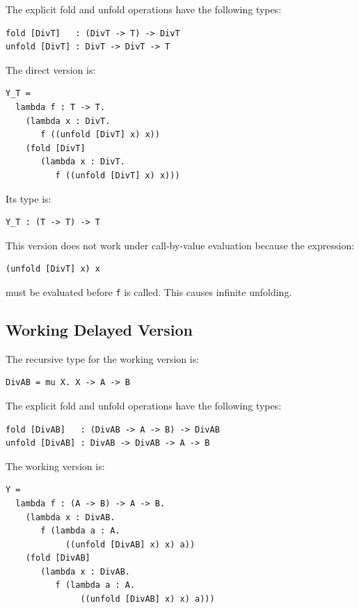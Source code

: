 \documentclass[manuscript]{acmart}
\begin{document}
The explicit fold and unfold operations have the following types:

\begin{lstlisting}
fold [DivT]   : (DivT -> T) -> DivT
unfold [DivT] : DivT -> DivT -> T
\end{lstlisting}

The direct version is:

\begin{lstlisting}
Y_T =
  lambda f : T -> T.
    (lambda x : DivT.
       f ((unfold [DivT] x) x))
    (fold [DivT]
       (lambda x : DivT.
          f ((unfold [DivT] x) x)))
\end{lstlisting}

Its type is:

\begin{lstlisting}
Y_T : (T -> T) -> T
\end{lstlisting}

This version does not work under call-by-value evaluation because the expression:

\begin{lstlisting}
(unfold [DivT] x) x
\end{lstlisting}

must be evaluated before \texttt{f} is called. This causes infinite unfolding.

\subsection{Working Delayed Version}

The recursive type for the working version is:

\begin{lstlisting}
DivAB = mu X. X -> A -> B
\end{lstlisting}

The explicit fold and unfold operations have the following types:

\begin{lstlisting}
fold [DivAB]   : (DivAB -> A -> B) -> DivAB
unfold [DivAB] : DivAB -> DivAB -> A -> B
\end{lstlisting}

The working version is:

\begin{lstlisting}
Y =
  lambda f : (A -> B) -> A -> B.
    (lambda x : DivAB.
       f (lambda a : A.
            ((unfold [DivAB] x) x) a))
    (fold [DivAB]
       (lambda x : DivAB.
          f (lambda a : A.
               ((unfold [DivAB] x) x) a)))
\end{lstlisting}
\end{document}
